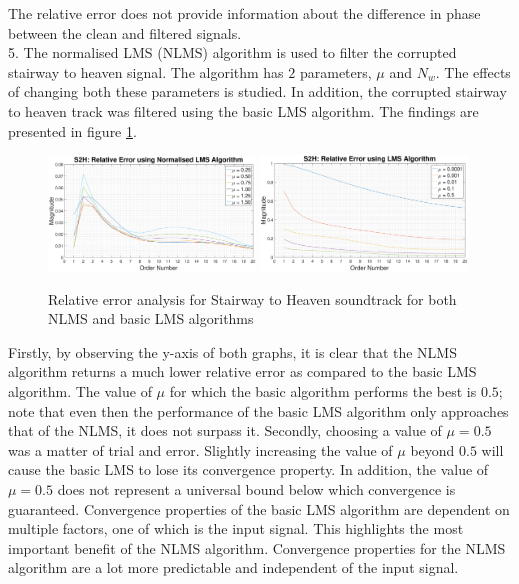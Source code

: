 \documentclass{article}
\begin{document}
The relative error does not provide information about the difference in phase between the clean and filtered signals. \\

5. The normalised LMS (NLMS) algorithm is used to filter the corrupted stairway to heaven signal. The algorithm has $2$ parameters, $\mu$ and $N_{w}$. The effects of changing both these parameters is studied. In addition, the corrupted stairway to heaven track was filtered using the basic LMS algorithm. The findings are presented in figure \ref{fig:nlms_s2h}. 

\begin{figure}[H]
    \centering
    \includegraphics[width=0.49\textwidth]{nlms_relative_error}
    \includegraphics[width=0.49\textwidth]{lms_relative_error}
    \caption{Relative error analysis for Stairway to Heaven soundtrack for both NLMS and basic LMS algorithms}
    \label{fig:nlms_s2h}
\end{figure}

Firstly, by observing the y-axis of both graphs, it is clear that the NLMS algorithm returns a much lower relative error as compared to the basic LMS algorithm. The value of $\mu$ for which the basic algorithm performs the best is $0.5$; note that even then the performance of the basic LMS algorithm only approaches that of the NLMS, it does not surpass it. Secondly, choosing a value of $\mu = 0.5$ was a matter of trial and error. Slightly increasing the value of $\mu$ beyond $0.5$ will cause the basic LMS to lose its convergence property. In addition, the value of $\mu = 0.5$ does not represent a universal bound below which convergence is guaranteed. Convergence properties of the basic LMS algorithm are dependent on multiple factors, one of which is the input signal. This highlights the most important benefit of the NLMS algorithm. Convergence properties for the NLMS algorithm are a lot more predictable and independent of the input signal.\\
\end{document}
